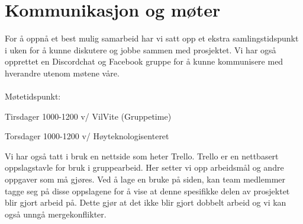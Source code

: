 \documentclass{article}
\begin{document}
\newpage
\section*{Kommunikasjon og møter}
For å oppnå et best mulig samarbeid har vi satt opp et ekstra samlingstidspunkt i uken for å kunne diskutere og jobbe sammen med prosjektet. Vi har også opprettet en Discordchat og Facebook gruppe for å kunne kommunisere med hverandre utenom møtene våre.\\\\
Møtetidspunkt:
			\begin{list}{-}{}
				\item Tirsdager 1000-1200 v/ VilVite (Gruppetime) 
				\item Torsdager 1000-1200 v/ Høyteknologisenteret
			\end{list}

Vi har også tatt i bruk en nettside som heter Trello. Trello er en nettbasert oppslagstavle for bruk i gruppearbeid. Her setter vi opp arbeidsmål og andre oppgaver som må gjøres. Ved å lage en bruke på siden, kan team medlemmer tagge seg på disse oppslagene for å vise at denne spesifikke delen av prosjektet blir gjort arbeid på. Dette gjør at det ikke blir gjort dobbelt arbeid og vi kan også unngå mergekonflikter.
\end{document}
